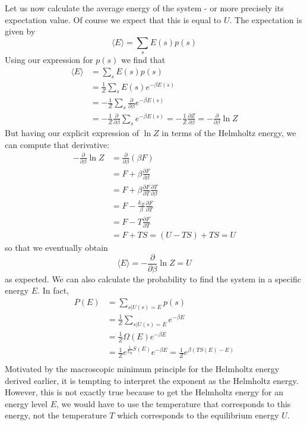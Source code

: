\documentclass[a4paper, draft]{report}
\numberwithin{section}{chapter}
\numberwithin{equation}{chapter}
\theoremstyle{own}
\theoremstyle{remark}
\begin{document}
Let us now calculate the average energy of the system - or more precisely its expectation value. Of course we expect that this is equal to $U$. The expectation is given by
$$
 \langle E \rangle = \sum_s E(s) p(s)
$$
Using our expression for $p(s)$ we find that
\begin{align*}
\langle E \rangle &= \sum_s E(s) p(s) \\&= \frac{1}{Z} \sum_s E(s) e^{-\beta E(s)} \\
&= - \frac{1}{Z} \sum_s \frac{\partial}{\partial \beta} e^{-\beta E(s)} \\
&= - \frac{1}{Z} \frac{\partial}{\partial \beta} \sum_s e^{-\beta E(s)} 
= - \frac{1}{Z}\frac{\partial Z}{\partial \beta} = - \frac{\partial }{\partial \beta} \ln Z
\end{align*}
But having our explicit expression of $\ln Z$ in terms of the Helmholtz energy, we can compute that derivative:
\begin{align*}
- \frac{\partial }{\partial \beta} \ln Z 
&=  \frac{\partial }{\partial \beta} (\beta F) \\
&= F + \beta \frac{\partial F}{\partial \beta} \\
&= F + \beta \frac{\partial F}{\partial T} \frac{\partial T}{\partial \beta} \\
&= F - \frac{k_B}{\beta} \frac{\partial F}{\partial T} \\
&= F - T \frac{\partial F}{\partial T} \\
&= F + T S = (U - TS) + TS = U 
\end{align*}
so that we eventually obtain
$$
\langle E \rangle = - \frac{\partial }{\partial \beta} \ln Z  = U
$$
as expected. We can also calculate the probability to find the system in a specific energy $E$. In fact,
\begin{align*}
P(E) &= \sum_{s | U(s) = E} p(s) \\
&=   \frac{1}{Z} \sum_{s | U(s) = E} e^{-\beta E} \\
&= \frac{1}{Z}  \Omega(E) e^{-\beta E} \\
&= \frac{1}{Z}  e^{\frac{1}{k_B} S(E)} e^{-\beta E} = \frac{1}{Z}  e^{\beta(TS(E) - E)} \\
\end{align*}
Motivated by the macroscopic minimum principle for the Helmholtz energy derived earlier, it is tempting to interpret the exponent as the Helmholtz energy. However, this is not exactly true because to get the Helmholtz energy for an energy level $E$, we would have to use the temperature that corresponds to this energy, not the temperature $T$ which corresponds to the equilibrium energy $U$. 
\end{document}
